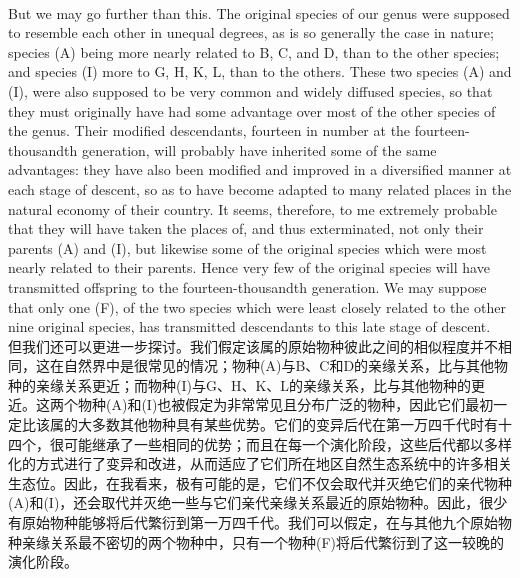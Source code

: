\documentclass{article}
\begin{document}
\\
But we may go further than this. The original species of our genus were supposed to resemble each other in unequal degrees, as is so generally the case in nature; species (A) being more nearly related to B, C, and D, than to the other species; and species (I) more to G, H, K, L, than to the others. These two species (A) and (I), were also supposed to be very common and widely diffused species, so that they must originally have had some advantage over most of the other species of the genus. Their modified descendants, fourteen in number at the fourteen-thousandth generation, will probably have inherited some of the same advantages: they have also been modified and improved in a diversified manner at each stage of descent, so as to have become adapted to many related places in the natural economy of their country. It seems, therefore, to me extremely probable that they will have taken the places of, and thus exterminated, not only their parents (A) and (I), but likewise some of the original species which were most nearly related to their parents. Hence very few of the original species will have transmitted offspring to the fourteen-thousandth generation. We may suppose that only one (F), of the two species which were least closely related to the other nine original species, has transmitted descendants to this late stage of descent.\\
但我们还可以更进一步探讨。我们假定该属的原始物种彼此之间的相似程度并不相同，这在自然界中是很常见的情况；物种(A)与B、C和D的亲缘关系，比与其他物种的亲缘关系更近；而物种(I)与G、H、K、L的亲缘关系，比与其他物种的更近。这两个物种(A)和(I)也被假定为非常常见且分布广泛的物种，因此它们最初一定比该属的大多数其他物种具有某些优势。它们的变异后代在第一万四千代时有十四个，很可能继承了一些相同的优势；而且在每一个演化阶段，这些后代都以多样化的方式进行了变异和改进，从而适应了它们所在地区自然生态系统中的许多相关生态位。因此，在我看来，极有可能的是，它们不仅会取代并灭绝它们的亲代物种(A)和(I)，还会取代并灭绝一些与它们亲代亲缘关系最近的原始物种。因此，很少有原始物种能够将后代繁衍到第一万四千代。我们可以假定，在与其他九个原始物种亲缘关系最不密切的两个物种中，只有一个物种(F)将后代繁衍到了这一较晚的演化阶段。 
\end{document}
